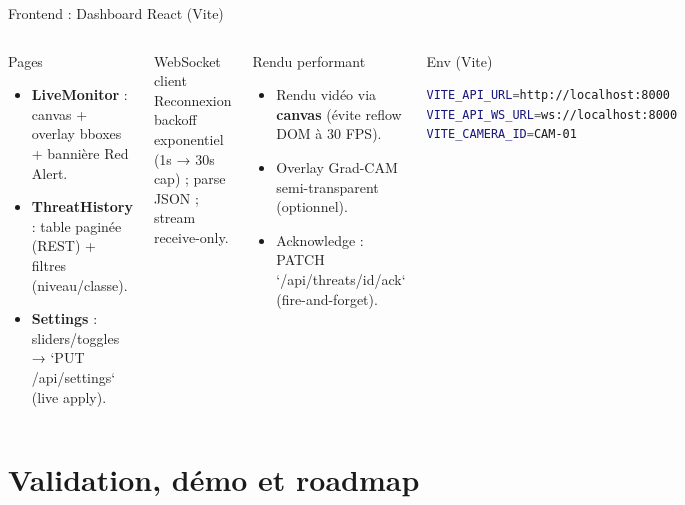 \documentclass[aspectratio=169,11pt]{beamer}
\begin{document}
\begin{frame}{Frontend : Dashboard React (Vite)}
  \begin{columns}[T,onlytextwidth]
    \begin{block}{Pages}
      \begin{itemize}
        \item \textbf{LiveMonitor} : canvas + overlay bboxes + bannière Red Alert.
        \item \textbf{ThreatHistory} : table paginée (REST) + filtres (niveau/classe).
        \item \textbf{Settings} : sliders/toggles → `PUT /api/settings` (live apply).
      \end{itemize}
    \end{block}

    \begin{block}{WebSocket client}
      Reconnexion backoff exponentiel (1s → 30s cap) ; parse JSON ; stream receive-only.
    \end{block}

    \begin{block}{Rendu performant}
      \begin{itemize}
        \item Rendu vidéo via \textbf{canvas} (évite reflow DOM à 30 FPS).
        \item Overlay Grad-CAM semi-transparent (optionnel).
        \item Acknowledge : PATCH `/api/threats/{id}/ack` (fire-and-forget).
      \end{itemize}
    \end{block}

    \begin{block}{Env (Vite)}
\begin{lstlisting}[language=bash]
VITE_API_URL=http://localhost:8000
VITE_API_WS_URL=ws://localhost:8000
VITE_CAMERA_ID=CAM-01
\end{lstlisting}
    \end{block}
  \end{columns}
\end{frame}

\section{Validation, démo et roadmap}
\end{document}
